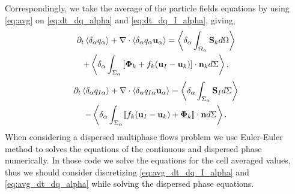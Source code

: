 Correspondingly, we take the average of the particle fields equations by using \ref{eq:avg} on \ref{eq:dt_dq_alpha} and \ref{eq:dt_dq_I_alpha}, giving, 
\begin{multline}
    \partial_t \left<\delta_\alpha  q_\alpha\right>
    + \mathbf{\nabla}\cdot \left<\delta_\alpha  q_\alpha \textbf{u}_\alpha\right>
    = \left<\delta_\alpha \int_{\Omega_\alpha} \textbf{S}_k d\Omega\right>\\
    + \left<\delta_\alpha \int_{\Sigma_\alpha} \left[\mathbf{\Phi}_k + f_k (\textbf{u}_I-\textbf{u}_k) \right] \cdot \textbf{n}_k d\Sigma\right>,
    \label{eq:avg_dt_dq_alpha}
\end{multline}
\begin{multline}
    \partial_t \left<\delta_\alpha  q_{I\alpha}\right>
    + \mathbf{\nabla}\cdot \left<\delta_\alpha  q_{I\alpha} \textbf{u}_\alpha\right>
    = \left<\delta_\alpha \int_{\Sigma_\alpha} 
    \textbf{S}_I
    d\Sigma\right>\\
    - \left<\delta_\alpha \int_{\Sigma_\alpha} \llbracket 
        f_k (\textbf{u}_I - \textbf{u}_k)
        + \mathbf{\Phi}_k \rrbracket \cdot \textbf{n}
        d\Sigma\right>.
        \label{eq:avg_dt_dq_I_alpha}
\end{multline}
When considering a dispersed multiphase flows problem we use Euler-Euler method to solves the equations of the continuous and dispersed phase numerically. 
In those code we solve the equations for the cell averaged values, thus we should consider discretizing \ref{eq:avg_dt_dq_I_alpha} and \ref{eq:avg_dt_dq_alpha} while solving the dispersed phase equations.